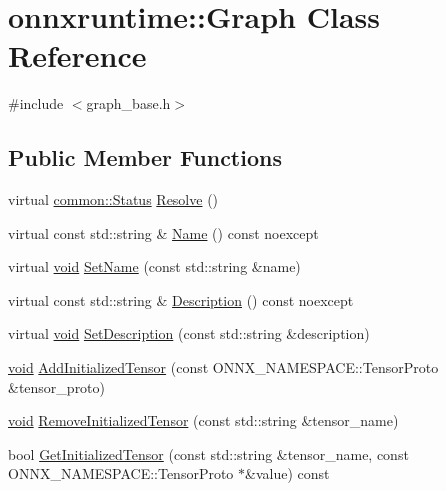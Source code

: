 \hypertarget{classonnxruntime_1_1Graph}{}\section{onnxruntime\+:\+:Graph Class Reference}
\label{classonnxruntime_1_1Graph}


{\ttfamily \#include $<$graph\+\_\+base.\+h$>$}

\subsection*{Public Member Functions}
\begin{DoxyCompactItemize}
\item 
virtual \mbox{\hyperlink{classonnxruntime_1_1common_1_1Status}{common\+::\+Status}} \mbox{\hyperlink{classonnxruntime_1_1Graph_a339e752e0557c49da5e81e9fa8e3cb54}{Resolve}} ()
\item 
virtual const std\+::string \& \mbox{\hyperlink{classonnxruntime_1_1Graph_a94415a0533dea6f376c373a63a2bdc6e}{Name}} () const noexcept
\item 
virtual \mbox{\hyperlink{mlasi_8h_a88f941d423cb2a819b70a1358982b1a6}{void}} \mbox{\hyperlink{classonnxruntime_1_1Graph_aefeff3396d82aee4254a1ed21dc6469a}{Set\+Name}} (const std\+::string \&name)
\item 
virtual const std\+::string \& \mbox{\hyperlink{classonnxruntime_1_1Graph_a3cde3be78cc7acab2626b189af64f82f}{Description}} () const noexcept
\item 
virtual \mbox{\hyperlink{mlasi_8h_a88f941d423cb2a819b70a1358982b1a6}{void}} \mbox{\hyperlink{classonnxruntime_1_1Graph_abf45d42d7f95a9147c7830d9c2cd25ae}{Set\+Description}} (const std\+::string \&description)
\item 
\mbox{\hyperlink{mlasi_8h_a88f941d423cb2a819b70a1358982b1a6}{void}} \mbox{\hyperlink{classonnxruntime_1_1Graph_a5699ed675666c1b351bd35490d94be6d}{Add\+Initialized\+Tensor}} (const O\+N\+N\+X\+\_\+\+N\+A\+M\+E\+S\+P\+A\+C\+E\+::\+Tensor\+Proto \&tensor\+\_\+proto)
\item 
\mbox{\hyperlink{mlasi_8h_a88f941d423cb2a819b70a1358982b1a6}{void}} \mbox{\hyperlink{classonnxruntime_1_1Graph_a061af24d8be21ae2367a458cec6e5fc1}{Remove\+Initialized\+Tensor}} (const std\+::string \&tensor\+\_\+name)
\item 
bool \mbox{\hyperlink{classonnxruntime_1_1Graph_ae0637d52edb20ae9a2700a29eb931e9c}{Get\+Initialized\+Tensor}} (const std\+::string \&tensor\+\_\+name, const O\+N\+N\+X\+\_\+\+N\+A\+M\+E\+S\+P\+A\+C\+E\+::\+Tensor\+Proto $\ast$\&value) const

\end{DoxyCompactItemize}
